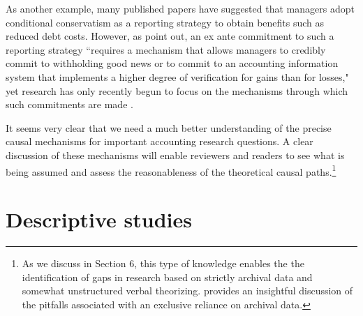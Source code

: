 \documentclass[12pt,reqno,titlepage]{amsart}
\begin{document}
\begin{doublespace}
As another example, many published papers have suggested that managers adopt conditional conservatism as a reporting strategy to obtain benefits such as reduced debt costs. %
However, as \citet[p.\,317]{Beyer:2010cj} point out, an ex ante commitment to such a reporting strategy ``requires a mechanism that allows managers to credibly commit to withholding good news or to commit to an accounting information system that implements a higher degree of verification for gains than for losses," yet research has only recently begun to focus on the mechanisms through which such commitments are made \citep[e.g.,][]{Erkens:2014hj}.

It seems very clear that we need a much better understanding of the precise causal mechanisms for important accounting research questions. A clear discussion of these mechanisms will enable reviewers and readers to see what is being assumed and assess the reasonableness of the theoretical causal paths.\footnote{ As we discuss in Section 6, this type of knowledge enables the the identification of gaps in research based on strictly archival data and somewhat unstructured verbal theorizing. \cite{Soltes:2014gr} provides an insightful discussion of the pitfalls associated with an exclusive reliance on archival data.} 




\section{Descriptive studies} \label{sec:desc}


\end{doublespace}
\end{document}
